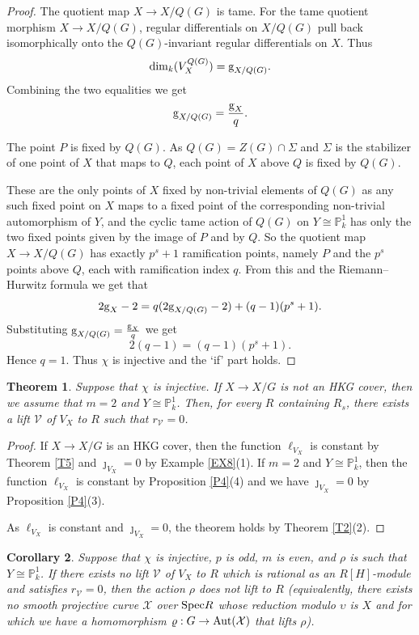 \documentclass[11pt]{amsart}
\newtheorem{theorem}{Theorem}[section]
\newtheorem{corollary}[theorem]{Corollary}
\def\Aut{\textup{Aut}}
\def\Spec{\textup{Spec}}
\begin{document}
\begin{proof}
The quotient map $X\rightarrow X/Q(G)$ is tame. For the tame quotient morphism $X\rightarrow X/Q(G)$, regular differentials on $X/Q(G)$ pull back isomorphically onto the $Q(G)$-invariant regular differentials on $X$. Thus
$$\dim_k(V_X^{Q(G)})=\textup{g}_{X/Q(G)}.$$
Combining the two equalities we get
$$\textup{g}_{X/Q(G)}=\frac{\textup{g}_X}{q}.$$

The point $P$ is fixed by $Q(G)$. As $Q(G)=Z(G)\cap\Sigma$ and $\Sigma$ is the stabilizer of one point of $X$ that maps to $Q$, each point of $X$ above $Q$ is fixed by $Q(G)$.

These are the only points of $X$ fixed by non-trivial elements of $Q(G)$ as any such fixed point on $X$ maps to a fixed point of the corresponding non-trivial automorphism of $Y$, and the cyclic tame action of $Q(G)$ on $Y\cong\mathbb P_k^1$ has only the two fixed points given by the image of $P$ and by $Q$. So the quotient map $X\rightarrow X/Q(G)$ has exactly $p^s+1$ ramification points, namely $P$ and the $p^s$ points above $Q$, each with ramification index $q$. From this and the Riemann--Hurwitz formula we get that
$$2\textup{g}_X-2=q(2\textup{g}_{X/Q(G)}-2)+(q-1)(p^s+1).$$
Substituting $\textup{g}_{X/Q(G)}=\frac{\textup{g}_X}{q}$ we get
$$2(q-1)=(q-1)(p^s+1).$$
Hence $q=1$. Thus $\chi$ is injective and the `if' part holds.
\end{proof}

\begin{theorem}\label{T6}
Suppose that $\chi$ is injective. If $X\rightarrow X/G$ is not an HKG cover, then we assume that $m=2$ and $Y\cong\mathbb P_k^1$. Then, for every $R$ containing $R_s$, there exists a lift $\mathcal V$ of $V_X$ to $R$ such that $r_{\mathcal V}=0$.
\end{theorem}

\begin{proof}
If $X\rightarrow X/G$ is an HKG cover, then the function $\ell_{V_X}$ is constant by Theorem \ref{T5} and $\jmath_{V_X}=0$ by Example \ref{EX8}(1). If $m=2$ and $Y\cong\mathbb P_k^1$, then the function $\ell_{V_X}$ is constant by Proposition \ref{P4}(4) and we have $\jmath_{V_X}=0$ by Proposition \ref{P4}(3). 

As $\ell_{V_X}$ is constant and $\jmath_{V_X}=0$, the theorem holds by Theorem \ref{T2}(2).\end{proof}

\begin{corollary}\label{C5}
Suppose that $\chi$ is injective, $p$ is odd, $m$ is even, and $\rho$ is such that $Y\cong\mathbb P^1_k$. If there exists no lift $\mathcal V$ of $V_X$ to $R$ which is rational as an $R[H]$-module and satisfies $r_{\mathcal V}=0$, then the action $\rho$ does not lift to $R$ (equivalently, there exists no smooth projective curve $\mathcal X$ over $\Spec R$ whose reduction modulo $\upsilon$ is $X$ and for which we have a homomorphism $\varrho:G\rightarrow\Aut(\mathcal X)$ that lifts $\rho$).
\end{corollary}
\end{document}
